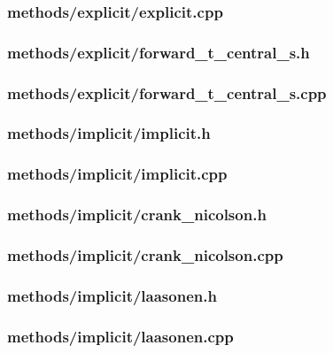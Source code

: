 \documentclass[12pt]{article}
\begin{document}
\subsubsection*{methods/explicit/explicit.cpp}


\subsubsection*{methods/explicit/forward\_t\_central\_s.h}


\subsubsection*{methods/explicit/forward\_t\_central\_s.cpp}


\subsubsection*{methods/implicit/implicit.h}


\subsubsection*{methods/implicit/implicit.cpp}


\subsubsection*{methods/implicit/crank\_nicolson.h}


\subsubsection*{methods/implicit/crank\_nicolson.cpp}


\subsubsection*{methods/implicit/laasonen.h}


\subsubsection*{methods/implicit/laasonen.cpp}

\end{document}
